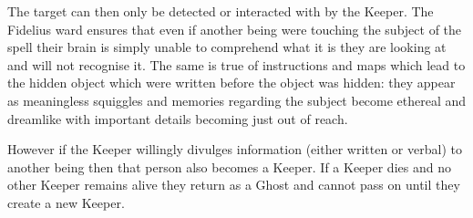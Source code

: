 \begin{multicols}{3}
{The target can then only be detected or interacted with by the Keeper. The Fidelius ward ensures that even if another being were touching the subject of the spell\comma{} their brain is simply unable to comprehend what it is they are looking at\comma{} and will not recognise it. The same is true of instructions and maps which lead to the hidden object which were written before the object was hidden: they appear as meaningless squiggles\comma{} and memories regarding the subject become ethereal and dreamlike \minus{} with important details becoming just out of reach. 

However\comma{} if the Keeper willingly divulges information (either written\comma{} or verbal) to another being\comma{} then that person also becomes a Keeper. If a Keeper dies\comma{} and no other Keeper remains alive\comma{} they return as a Ghost and cannot pass on until they create a new Keeper. 

}
\end{multicols}
